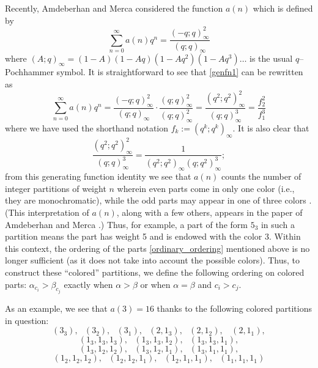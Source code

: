 \documentclass[10pt, reqno]{amsart}
\theoremstyle{theorem}
\theoremstyle{definition}
\theoremstyle{example}
\begin{document}
Recently, Amdeberhan and Merca \cite{AM} considered the function $a(n)$ which is defined by 
\begin{equation}
\label{genfn1}
\sum_{n=0}^\infty a(n)q^n = \frac{(-q;q)_\infty^2}{(q;q)_\infty}
\end{equation}
where $(A;q)_\infty = (1-A)(1-Aq)(1-Aq^2)(1-Aq^3)\dots $ is the usual $q$--Pochhammer symbol.  It is straightforward to see that \eqref{genfn1} can be rewritten as 
\begin{equation}
\label{genfn2}
\sum_{n=0}^\infty a(n)q^n =  \frac{(-q;q)_\infty^2}{(q;q)_\infty}\cdot \frac{(q;q)_\infty^2}{(q;q)_\infty^2} = \frac{(q^2;q^2)_\infty^2}{(q;q)_\infty^3} = \frac{f_2^2}{f_1^3}
\end{equation}
where we have used the shorthand notation $f_k:=(q^k;q^k)_\infty$.  It is also clear that 
$$
\frac{(q^2;q^2)_\infty^2}{(q;q)_\infty^3} = \frac{1}{(q^2;q^2)_\infty (q;q^2)_\infty^3};
$$ 
from this generating function identity we see that $a(n)$ counts the number of integer partitions of weight $n$ wherein even parts come in only one color (i.e., they are monochromatic), while the odd parts may appear in one of three colors \cite[\href{https://oeis.org/A298311}{A298311}]{OEIS}.  (This interpretation of $a(n)$, along with a few others, appears in the paper of Amdeberhan and Merca \cite{AM}.)  Thus, for example, a part of the form $5_3$ in such a partition means the part has weight 5 and is endowed with the color 3.  Within this context, the ordering of the parts \eqref{ordinary_ordering} mentioned above is no longer sufficient (as it does not take into account the possible colors).  Thus, to construct these ``colored'' partitions, we define the following ordering on colored parts:
$ \alpha_{c_i} > \beta_{c_j}$  exactly when $\alpha > \beta$ or when $ \alpha=\beta$ and $c_i > c_j$.  

As an example, we see that $a(3) = 16$ thanks to the following colored partitions in question:
$$
(3_3), \ \ \ (3_2), \ \ \ (3_1), \ \ \ (2,1_3), \ \ \ (2,1_2), \ \ \ \ (2,1_1),
$$
$$
(1_3,1_3,1_3), \ \ \ (1_3,1_3,1_2), \ \ \ (1_3,1_3,1_1), 
$$
$$
(1_3,1_2,1_2), \ \ \  (1_3,1_2,1_1), \ \ \  (1_3,1_1,1_1), 
$$
$$
(1_2,1_2,1_2), \ \ \  (1_2,1_2,1_1), \ \ \  (1_2,1_1,1_1), \ \ \  (1_1,1_1,1_1)
$$
\end{document}
